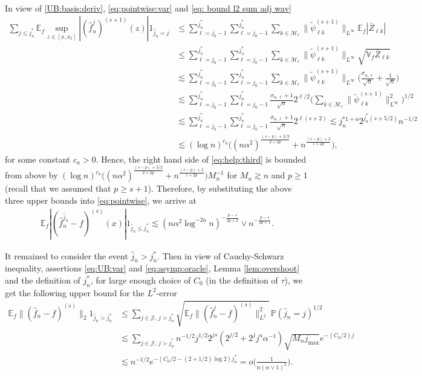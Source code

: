 \documentclass[preprint]{imsart}
\newcommand{\E}{{\mathbb E}}
\numberwithin{equation}{section}
\begin{document}
\begin{appendix}
\begin{align*}
\end{align*}
In view of \eqref{UB:basis:deriv}, \eqref{eq:pointwise:var} and \eqref{eq: bound l2 sum adj wav}
\begin{align}
\sum_{j\leq j_n^*}\E_f \sup_{z\in [x,x_t]}| (\hat{f}_n^{j})^{(s+1)}(z)|1_{\hat{j}_n=j}
&\leq \sum_{\ell =j_0-1}^{j_n^*}\sum_{\ell =j_0-1}^{j_n^*}\sum_{k\in\mathcal{M}_\ell}  \|\tilde\psi_{\ell k}^{(s+1)}\|_{L^\infty} \E_f |\bar{Z}_{\ell k}|\nonumber\\
&\leq \sum_{\ell =j_0-1}^{j_n^*}\sum_{\ell =j_0-1}^{j_n^*}\sum_{k\in\mathcal{M}_\ell}  \|\tilde\psi_{\ell k}^{(s+1)}\|_{L^\infty} \sqrt{\mathbb{V}_f \bar{Z}_{\ell k}}\nonumber\\
&\lesssim \sum_{\ell =j_0-1}^{j_n^*}\sum_{\ell =j_0-1}^{j_n^*}\sum_{k\in\mathcal{M}_\ell} \|\tilde\psi_{\ell k}^{(s+1)}\|_{L^\infty}\Big(  \frac{\sigma_{\alpha,\ell}}{\sqrt{n}} +\frac{1}{\sqrt{n}} \Big)\nonumber\\
&\lesssim \sum_{\ell =j_0-1}^{j_n^*}\sum_{\ell =j_0-1}^{j_n^*}  \frac{\sigma_{\alpha,\ell}+1}{\sqrt{n}}2^{\ell/2}  \Big(\sum_{k\in\mathcal{M}_\ell}  \|\tilde\psi_{\ell k}^{(s+1)}\|_{L^\infty}^2\Big)^{1/2}\nonumber\\
&\lesssim \sum_{\ell =j_0-1}^{j_n^*}\sum_{\ell =j_0-1}^{j_n^*}  \frac{\sigma_{\alpha,\ell}+1}{\sqrt{n}} 2^{\ell(s+2)}\nonumber\lesssim j_n^{*1+a} 2^{j_n^*(s+5/2)}n^{-1/2}\\
& \lesssim (\log n)^{c_a} \Big((n\alpha^2)^{\frac{(s-p)+3/2}{2+2p}}+n^{\frac{(s-p)+2}{1+2p}} \Big), \label{eq:UB:sup:deriv}
\end{align}
for some constant $c_a>0$.
 Hence, the right hand side of \eqref{eq:help:third} is bounded from above by $ (\log n)^{c_a} \big((n\alpha^2)^{\frac{(s-p)+3/2}{2+2p}}+n^{\frac{(s-p)+2}{1+2p}}\big) M_n^{-1}$ for $M_n\gtrsim n$ and $p\geq 1$ (recall that we assumed that $p\geq s+1$). Therefore, by substituting the above three upper bounds into \eqref{eq:pointwise}, we arrive at
\begin{align*}
\E_f|(\hat{f}_n^{\hat{j}_n}-f)^{(s)}(x)| 1_{\hat{j}_n\leq j_n^*}\lesssim   (n\alpha^2\log^{-2a} n)^{-\frac{p-s}{2p+2}}\vee n^{-\frac{p-s}{2p+1}}.
\end{align*}


It remained to consider the event $\hat{j}_n>j_n^*$. Then in view of Cauchy-Schwarz inequality, assertions \eqref{eq:UB:var} and  \eqref{eq:asymp:oracle}, Lemma \ref{lem:overshoot} and the definition of $j_n^*$, for large enough choice of $C_0$ (in the definition of $\tau$), we get the following upper bound for the $L^2$-error
\begin{align*}
\E_f\|(\hat{f}_n-f)^{(s)}\|_2 1_{\hat{j}_n> j_n^*}&\leq \sum_{j\in\mathcal{J},\, j>j_n^*} \sqrt{\E_f\|(\hat{f}_n^j-f)^{(s)}\|_{L^2}^2}\, \mathbb{P}(\hat{j}_n=j)^{1/2}\\
&\lesssim  \sum_{j\in\mathcal{J},\, j>j_n^*} n^{-1/2}j^{1/2}2^{js}(2^{j/2}+2^j j^a\alpha^{-1})  \sqrt{M_n j_{\max}}e^{-(C_0/2) j} \\
&\lesssim n^{-1/2} e^{-(C_0/2- (2+1/2)\log 2)j_n^*} 
=o\Big( \frac{1}{n(\alpha\vee1)^2}\Big).
\end{align*}


\end{appendix}
\end{document}
